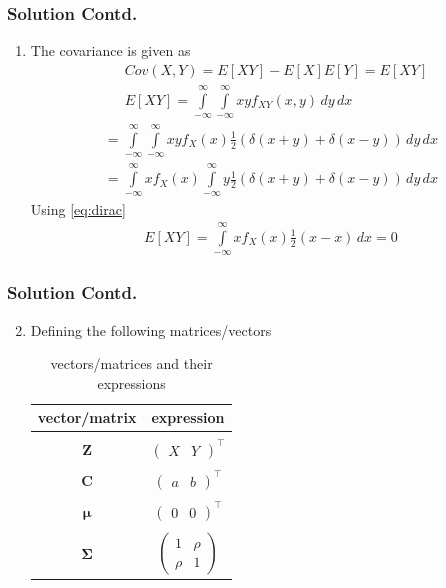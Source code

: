 \documentclass{beamer}
\begin{document}
 \begin{frame}
 \frametitle{Solution Contd.}
\begin{enumerate}\item
 The covariance is given as
\begin{align}
&Cov(X,Y)=E[XY]-E[X]E[Y]=E[XY]\\
&E[XY]=\int\limits_{-\infty}^{\infty}\int\limits_{-\infty}^{\infty}xyf_{XY}(x,y)\, dy\, dx
\end{align}
\begin{align}
=\int\limits_{-\infty}^{\infty}\int\limits_{-\infty}^{\infty}xyf_X(x)\frac{1}{2}(\delta(x+y)+\delta(x-y))\,dy\,dx\\
=\int\limits_{-\infty}^{\infty} xf_X(x)\int\limits_{-\infty}^{\infty}y\frac{1}{2}(\delta(x+y)+\delta(x-y))\,dy\,dx
\end{align}
Using \eqref{eq:dirac}
\begin{align}
E[XY]=\int\limits_{-\infty}^{\infty}xf_X(x)\frac{1}{2}(x-x)\,dx=0
\end{align}
\end{enumerate}
 \end{frame}

 \begin{frame}
 \frametitle{Solution Contd.}
\begin{enumerate}
\setcounter{enumi}{1}
\item
Defining the following matrices/vectors
\begin{table}[h!]
\centering
\begin{tabular}{ |c|c|} 
\hline
\textbf{vector/matrix} & \textbf{expression} \\
\hline&\\[-1em]
$\boldsymbol{Z}$& $\begin{pmatrix} X &Y\end{pmatrix}^\top$\\[2pt]
\hline&\\[-1em]
$\boldsymbol{C}$&$\begin{pmatrix} a &b\end{pmatrix}^\top$  \\[2pt]
\hline&\\[-1em]
$\boldsymbol{\mu}$&$\begin{pmatrix} 0 &0\end{pmatrix}^\top$  \\[2pt]
\hline&\\[-1em]
$\boldsymbol{\Sigma}$&$\begin{pmatrix}1&\rho\\\rho&1\end{pmatrix}$ \\
\hline
\end{tabular}
\caption{vectors/matrices and their expressions}
\label{table1}
\end{table}
\end{enumerate}
 \end{frame}
\end{document}

